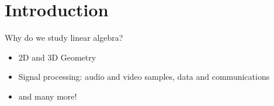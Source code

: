 \documentclass[../linear_algebra_and_groups.tex]{subfiles}
\begin{document}
\chapter*{Introduction}

Why do we study linear algebra?
\begin{itemize}
    \item 2D and 3D Geometry
    \item Signal processing: audio and video samples, data and communications
    \item and many more!
\end{itemize}
\end{document}
